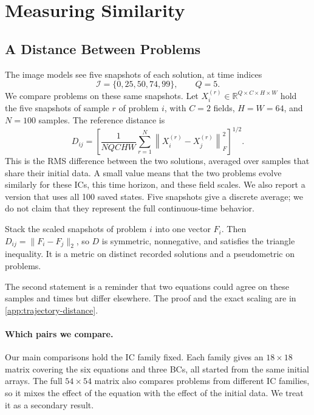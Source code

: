 \section{Measuring Similarity}
\label{sec:comparison}
\subsection{A Distance Between Problems}
The image models see five snapshots of each solution, at time indices
\[
 \mathcal I=\{0,25,50,74,99\},\qquad Q=5.
\]
We compare problems on these same snapshots. Let $X_i^{(r)}\in\mathbb R^{Q\times C\times H\times W}$ hold the five snapshots of sample $r$ of problem $i$, with $C=2$ fields, $H=W=64$, and $N=100$ samples. The reference distance is
\begin{equation}
 \boxed{D_{ij}=\left[
 \frac{1}{NQCHW}\sum_{r=1}^{N}
 \left\|X_i^{(r)}-X_j^{(r)}\right\|_F^2
 \right]^{1/2}.}
\label{eq:rms}
\end{equation}
This is the RMS difference between the two solutions, averaged over samples that share their initial data. A small value means that the two problems evolve similarly for these ICs, this time horizon, and these field scales. We also report a version that uses all 100 saved states. Five snapshots give a discrete average; we do not claim that they represent the full continuous-time behavior.

\begin{proposition}
Stack the scaled snapshots of problem $i$ into one vector $F_i$. Then $D_{ij}=\|F_i-F_j\|_2$, so $D$ is symmetric, nonnegative, and satisfies the triangle inequality. It is a metric on distinct recorded solutions and a pseudometric on problems.
\label{prop:distance}
\end{proposition}
The second statement is a reminder that two equations could agree on these samples and times but differ elsewhere. The proof and the exact scaling are in \cref{app:trajectory-distance}.

\paragraph{Which pairs we compare.}
Our main comparisons hold the IC family fixed. Each family gives an $18\times18$ matrix covering the six equations and three BCs, all started from the same initial arrays. The full $54\times54$ matrix also compares problems from different IC families, so it mixes the effect of the equation with the effect of the initial data. We treat it as a secondary result.

